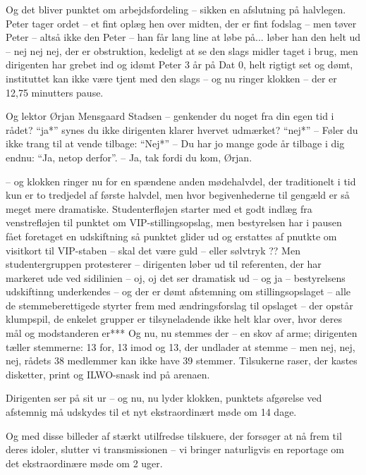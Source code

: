\documentclass[a4paper,11pt]{article}
\begin{document}
\begin{sketch}
Og det bliver punktet om arbejdsfordeling -- sikken en afslutning på
halvlegen. Peter tager ordet -- et fint oplæg hen over midten, der er fint
fodslag -- men tøver Peter -- altså ikke den Peter -- han får lang line at løbe
på... løber han den helt ud -- nej nej nej, der er obstruktion, kedeligt at se
den slags midler taget i brug, men dirigenten har grebet ind og idømt Peter 3 år
på Dat 0, helt rigtigt set og dømt, instituttet kan ikke være tjent med den
slags -- og nu ringer klokken -- der er 12,75 minutters pause.

Og lektor Ørjan Mensgaard Stadsen -- genkender du noget fra din egen tid i
rådet? ``ja*'' synes du ikke dirigenten klarer hvervet udmærket? ``nej*'' --
Føler du ikke trang til at vende tilbage: ``Nej*'' -- Du har jo mange gode år
tilbage i dig endnu: ``Ja, netop derfor''. -- Ja, tak fordi du kom, Ørjan.

-- og klokken ringer nu for en spændene anden mødehalvdel, der traditionelt i
tid kun er to tredjedel af første halvdel, men hvor begivenhederne til gengæld
er så meget mere dramatiske. Studenterfløjen starter med et godt indlæg fra
venstrefløjen til punktet om VIP-stillingsopslag, men bestyrelsen har i pausen
fået foretaget en udskiftning så punktet glider ud og erstattes af pnutkte om
visitkort til VIP-staben -- skal det være guld -- eller sølvtryk ?? Men
studentergruppen protesterer -- dirigenten løber ud til referenten, der har
markeret ude ved sidilinien -- oj, oj det ser dramatisk ud -- og ja --
bestyrelsens udskiftinng underkendes -- og der er dømt afstemning om
stillingsopslaget -- alle de stemmeberettigede styrter frem med ændringsforslag
til opslaget -- der opstår klumpspil, de enkelet grupper er tilsyneladende ikke
helt klar over, hvor deres mål og modstanderen er*** Og nu, nu stemmes der -- en
skov af arme; dirigenten tæller stemmerne: 13 for, 13 imod og 13, der undlader
at stemme -- men nej, nej, nej, rådets 38 medlemmer kan ikke have 39
stemmer. Tilsukerne raser, der kastes disketter, print og ILWO-snask ind på
arenaen.

Dirigenten ser på sit ur -- og nu, nu lyder klokken, punktets afgørelse ved
afstemnig må udskydes til et nyt ekstraordinært møde om 14 dage.

Og med disse billeder af stærkt utilfredse tilskuere, der forsøger at nå frem
til deres idoler, slutter vi transmissionen -- vi bringer naturligvis en
reportage om det ekstraordinære møde om 2 uger.

\end{sketch}
\end{document}
